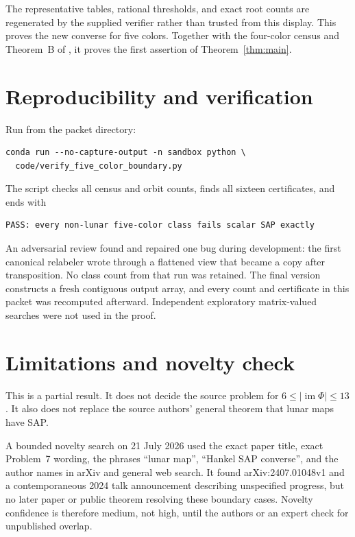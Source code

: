 \documentclass[11pt]{article}
\newcommand{\im}{\operatorname{im}}
\begin{document}
The representative tables, rational thresholds, and exact root counts are
regenerated by the supplied verifier rather than trusted from this display.
This proves the new converse for five colors.  Together with the four-color
census and Theorem~B of \cite{HanQiuWang2024}, it proves the first assertion of
Theorem~\ref{thm:main}.

\section{Reproducibility and verification}

Run from the packet directory:
\begin{verbatim}
conda run --no-capture-output -n sandbox python \
  code/verify_five_color_boundary.py
\end{verbatim}
The script checks all census and orbit counts, finds all sixteen certificates,
and ends with
\begin{verbatim}
PASS: every non-lunar five-color class fails scalar SAP exactly
\end{verbatim}

An adversarial review found and repaired one bug during development: the first
canonical relabeler wrote through a flattened view that became a copy after
transposition.  No class count from that run was retained.  The final version
constructs a fresh contiguous output array, and every count and certificate in
this packet was recomputed afterward.  Independent exploratory matrix-valued
searches were not used in the proof.

\section{Limitations and novelty check}

This is a partial result.  It does not decide the source problem for
$6\leq|\im\Phi|\leq13$.  It also does not replace the source authors' general
theorem that lunar maps have SAP.

A bounded novelty search on 21 July 2026 used the exact paper title, exact
Problem~7 wording, the phrases ``lunar map'', ``Hankel SAP converse'', and the
author names in arXiv and general web search.  It found arXiv:2407.01048v1 and
a contemporaneous 2024 talk announcement describing unspecified progress, but
no later paper or public theorem resolving these boundary cases.  Novelty
confidence is therefore medium, not high, until the authors or an expert check
for unpublished overlap.
\end{document}
